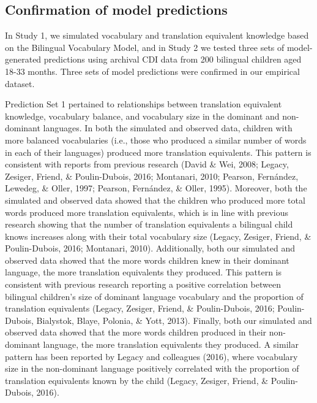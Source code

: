 \documentclass[
  english,
  ,man,floatsintext]{apa6}
\begin{document}
\hypertarget{confirmation-of-model-predictions}{%
\subsection{Confirmation of model predictions}\label{confirmation-of-model-predictions}}

In Study 1, we simulated vocabulary and translation equivalent knowledge based on the Bilingual Vocabulary Model, and in Study 2 we tested three sets of model-generated predictions using archival CDI data from 200 bilingual children aged 18-33 months. Three sets of model predictions were confirmed in our empirical dataset.

Prediction Set 1 pertained to relationships between translation equivalent knowledge, vocabulary balance, and vocabulary size in the dominant and non-dominant languages. In both the simulated and observed data, children with more balanced vocabularies (i.e., those who produced a similar number of words in each of their languages) produced more translation equivalents. This pattern is consistent with reports from previous research (David \& Wei, 2008; Legacy, Zesiger, Friend, \& Poulin-Dubois, 2016; Montanari, 2010; Pearson, Fernández, Lewedeg, \& Oller, 1997; Pearson, Fernández, \& Oller, 1995). Moreover, both the simulated and observed data showed that the children who produced more total words produced more translation equivalents, which is in line with previous research showing that the number of translation equivalents a bilingual child knows increases along with their total vocabulary size (Legacy, Zesiger, Friend, \& Poulin-Dubois, 2016; Montanari, 2010). Additionally, both our simulated and observed data showed that the more words children knew in their dominant language, the more translation equivalents they produced. This pattern is consistent with previous research reporting a positive correlation between bilingual children's size of dominant language vocabulary and the proportion of translation equivalents (Legacy, Zesiger, Friend, \& Poulin-Dubois, 2016; Poulin-Dubois, Bialystok, Blaye, Polonia, \& Yott, 2013). Finally, both our simulated and observed data showed that the more words children produced in their non-dominant language, the more translation equivalents they produced. A similar pattern has been reported by Legacy and colleagues (2016), where vocabulary size in the non-dominant language positively correlated with the proportion of translation equivalents known by the child (Legacy, Zesiger, Friend, \& Poulin-Dubois, 2016).
\end{document}
